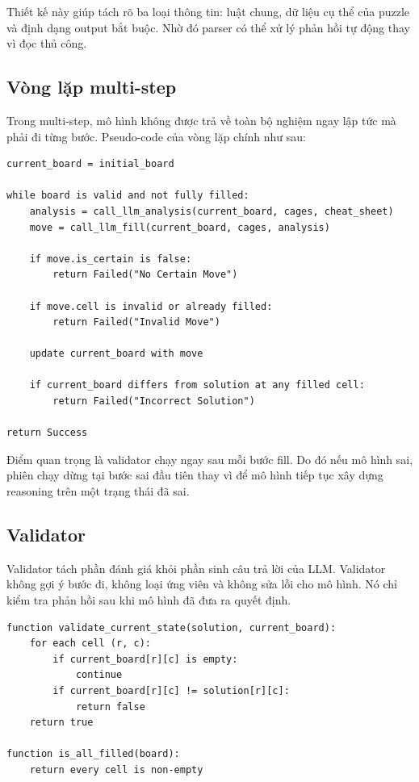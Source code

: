 \documentclass[12pt,a4paper,oneside]{report}
\newlength{\manualparindent}
\newcommand{\manualindent}{\hspace*{\manualparindent}}
\begin{document}
\manualindent%
Thiết kế này giúp tách rõ ba loại thông tin: luật chung, dữ liệu cụ thể của puzzle và định dạng output bắt buộc. Nhờ đó parser có thể xử lý phản hồi tự động thay vì đọc thủ công.

\subsection{Vòng lặp multi-step}

\manualindent%
Trong multi-step, mô hình không được trả về toàn bộ nghiệm ngay lập tức mà phải đi từng bước. Pseudo-code của vòng lặp chính như sau:

\begin{lstlisting}[style=promptstyle]
current_board = initial_board

while board is valid and not fully filled:
    analysis = call_llm_analysis(current_board, cages, cheat_sheet)
    move = call_llm_fill(current_board, cages, analysis)

    if move.is_certain is false:
        return Failed("No Certain Move")

    if move.cell is invalid or already filled:
        return Failed("Invalid Move")

    update current_board with move

    if current_board differs from solution at any filled cell:
        return Failed("Incorrect Solution")

return Success
\end{lstlisting}

\manualindent%
Điểm quan trọng là validator chạy ngay sau mỗi bước fill. Do đó nếu mô hình sai, phiên chạy dừng tại bước sai đầu tiên thay vì để mô hình tiếp tục xây dựng reasoning trên một trạng thái đã sai.

\subsection{Validator}

\manualindent%
Validator tách phần đánh giá khỏi phần sinh câu trả lời của LLM. Validator không gợi ý bước đi, không loại ứng viên và không sửa lỗi cho mô hình. Nó chỉ kiểm tra phản hồi sau khi mô hình đã đưa ra quyết định.

\begin{lstlisting}[style=promptstyle]
function validate_current_state(solution, current_board):
    for each cell (r, c):
        if current_board[r][c] is empty:
            continue
        if current_board[r][c] != solution[r][c]:
            return false
    return true

function is_all_filled(board):
    return every cell is non-empty
\end{lstlisting}
\end{document}
